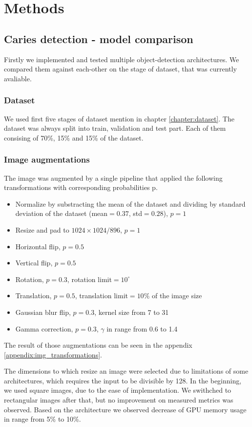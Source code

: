 \chapter{Methods}

\section{Caries detection - model comparison}

Firstly we implemented and tested multiple object-detection architectures. We compared them against each-other on the stage of dataset, that was currently avaliable.

\subsection{Dataset}
We used first five stages of dataset mention in chapter \ref{chapter:dataset}. The dataset was always split into train, validation and test part. Each of them consising of 70\%, 15\% and 15\% of the dataset.

\subsection{Image augmentations}
The image was augmented by a single pipeline that applied the following transformations with corresponding probabilities p.
\begin{itemize}
    \item Normalize by substracting the mean of the dataset and dividing by standard deviation of the dataset (mean$=0.37$, std$=0.28$), $p=1$
    \item Resize and pad to $1024\times1024/896$, $p=1$
    \item Horizontal flip, $p=0.5$
    \item Vertical flip, $p=0.5$
    \item Rotation, $p=0.3$, rotation limit$=10^{\circ}$
    \item Translation, $p=0.5$, translation limit$=10\%$ of the image size
    \item Gaussian blur flip, $p=0.3$, kernel size from 7 to 31
    \item Gamma correction, $p=0.3$, $\gamma$ in range from 0.6 to 1.4
\end{itemize}
The result of those augmentations can be seen in the appendix \ref{appendix:img_transformations}.

The dimensions to which resize an image were selected due to limitations of some architectures, which requires the input to be divisible by 128. In the beginning, we used square images, due to the ease of implementation. We swithched to rectangular images after that, but no improvement on measured metrics was observed. Based on the architecture we observed decrease of GPU memory usage in range from 5\% to 10\%.

